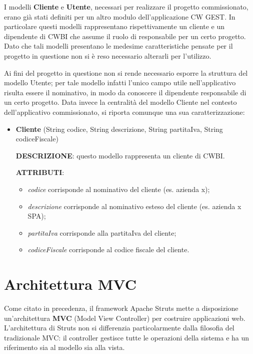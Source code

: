 \setlength{\parskip}{6ex}

\noindent I modelli \textbf{Cliente} e \textbf{Utente}, necessari per realizzare il progetto commissionato, erano già stati definiti per un altro modulo dell'applicazione CW GEST. In particolare questi modelli rappresentano rispettivamente un cliente e un dipendente di CWBI che assume il ruolo di responsabile per un certo progetto. Dato che tali modelli presentano le medesime caratteristiche pensate per il progetto in questione non si è reso necessario alterarli per l'utilizzo.

\setlength{\parskip}{3ex}

\noindent Ai fini del progetto in questione non si rende necessario esporre la struttura del modello Utente; per tale modello infatti l'unico campo utile nell'applicativo risulta essere il nominativo, in modo da conoscere il dipendente responsabile di un certo progetto. Data invece la centralità del modello Cliente nel contesto dell'applicativo commissionato, si riporta comunque una sua caratterizzazione:
\begin{itemize}
\item \textbf{Cliente} (String codice, String descrizione, String partitaIva, String codiceFiscale)

\setlength{\parskip}{3ex}

\textbf{DESCRIZIONE}: questo modello rappresenta un cliente di CWBI.

\setlength{\parskip}{3ex}

\textbf{ATTRIBUTI}:
\begin{itemize}
\item \textit{codice} corrisponde al nominativo del cliente (es. azienda x);
\item \textit{descrizione} corrisponde al nominativo esteso del cliente (es. azienda x SPA);
\item \textit{partitaIva} corrisponde alla partitaIva del cliente;
\item \textit{codiceFiscale} corrisponde al codice fiscale del cliente.
\end{itemize}
\end{itemize} 

\pagebreak

\section{Architettura MVC}
Come citato in precedenza, il framework Apache Struts mette a disposizione un'architettura \textbf{MVC} (Model View Controller) per costruire applicazioni web. \\
L'architettura di Struts non si differenzia particolarmente dalla filosofia del tradizionale MVC: il controller gestisce tutte le operazioni della sistema e ha un riferimento sia al modello sia alla vista. 

